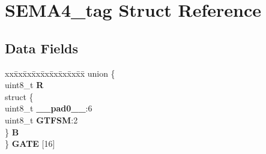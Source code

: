 \hypertarget{structSEMA4__tag}{}\section{S\+E\+M\+A4\+\_\+tag Struct Reference}
\label{structSEMA4__tag}
\subsection*{Data Fields}
\begin{DoxyCompactItemize}
\item 
\mbox{\label{structSEMA4__tag_a9b1764e5fc573ceaa0ba76a64b39ed8a}} 
\begin{tabbing}
xx\=xx\=xx\=xx\=xx\=xx\=xx\=xx\=xx\=\kill
union \{\\
\>uint8\_t {\bfseries R}\\
\>struct \{\\
\>\>uint8\_t {\bfseries \_\_pad0\_\_}:6\\
\>\>uint8\_t {\bfseries GTFSM}:2\\
\>\} {\bfseries B}\\
\} {\bfseries GATE} \mbox{[}16\mbox{]}\\


\end{tabbing}
\end{DoxyCompactItemize}
